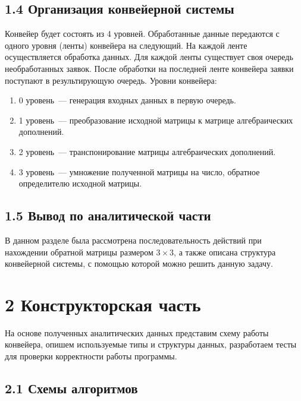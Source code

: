 \documentclass[12pt, a4paper]{report}
\begin{document}
	\section*{1.4 Организация конвейерной системы}
	
	Конвейер будет состоять из 4 уровней. Обработанные данные передаются с одного уровня (ленты) конвейера на следующий. На каждой ленте осуществляется обработка данных. Для каждой ленты существует своя очередь необработанных заявок. После обработки на последней ленте конвейера заявки поступают в результирующую очередь. Уровни конвейера:
	\begin{enumerate}
		\item 0 уровень~--- генерация входных данных в первую очередь.
		\item 1 уровень~--- преобразование исходной матрицы к матрице алгебраических дополнений.
		\item 2 уровень~--- транспонирование матрицы алгебраических дополнений.
		\item 3 уровень~--- умножение полученной матрицы на число, обратное определителю исходной матрицы.
	\end{enumerate}
	
	\section*{1.5 Вывод по аналитической части}
	В данном разделе была рассмотрена последовательность действий при нахождении обратной матрицы размером $3\times3$, а также описана структура конвейерной системы, с помощью которой можно решить данную задачу.
	
	\newpage
	\chapter*{2 Конструкторская часть}
	
	На основе полученных аналитических данных представим схему работы конвейера, опишем используемые типы и структуры данных, разработаем тесты для проверки корректности работы программы.
	
	\section*{2.1 Схемы алгоритмов}
	
\end{document}
